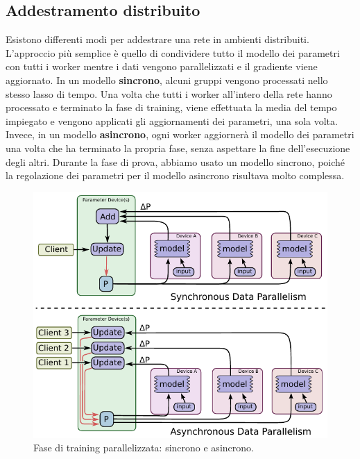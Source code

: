 \documentclass[DIV=calc, paper=a4, fontsize=11pt]{scrartcl}	 %
\begin{document}
\begin{multicols}{2}
			\subsection{Addestramento distribuito}
				Esistono differenti modi per addestrare una rete in ambienti distribuiti. L'approccio più semplice è quello di condividere tutto il modello dei parametri con tutti i worker mentre i dati vengono parallelizzati e il gradiente viene aggiornato. In un modello \textbf{sincrono}, alcuni gruppi vengono processati nello stesso lasso di tempo. Una volta che tutti i worker all'intero della rete hanno processato e terminato la fase di training, viene effettuata la media del tempo impiegato e vengono applicati gli aggiornamenti dei parametri, una sola volta. Invece, in un modello \textbf{asincrono}, ogni worker aggiornerà il modello dei parametri una volta che ha terminato la propria fase, senza aspettare la fine dell'esecuzione degli altri. Durante la fase di prova, abbiamo usato un modello sincrono, poiché la regolazione dei parametri per il modello asincrono risultava molto complessa.
				\begin{figure}[H]
					\centering
					\includegraphics[scale=.55]{img/sync-async.png}
					\caption{Fase di training parallelizzata: sincrono e asincrono.}
					\label{fig:sync-async}
				\end{figure}

\end{multicols}
\end{document}
